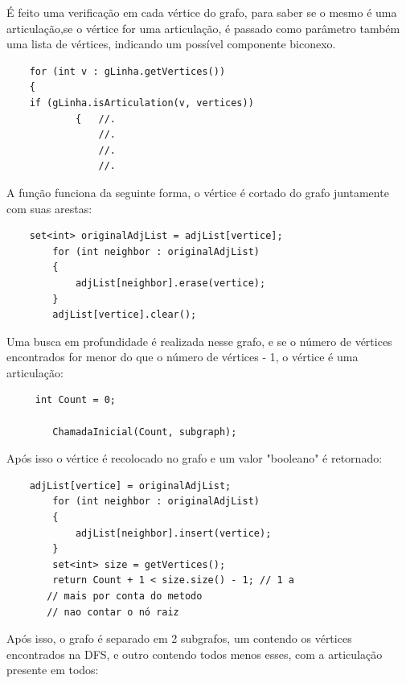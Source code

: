 \documentclass[10pt,conference]{IEEEtran}
\begin{document}
É feito uma verificação em cada vértice do grafo, para saber se o mesmo é uma articulação,se o vértice for uma articulação,
é passado como parâmetro também uma lista de vértices, indicando um possível componente biconexo. \begin{lstlisting}
    for (int v : gLinha.getVertices())
    {
    if (gLinha.isArticulation(v, vertices))
            {   //.
                //.
                //.
                //.
\end{lstlisting}

A função funciona da seguinte forma, o vértice é cortado do grafo juntamente com suas arestas: \begin{lstlisting}
    set<int> originalAdjList = adjList[vertice];
        for (int neighbor : originalAdjList)
        {
            adjList[neighbor].erase(vertice);
        }
        adjList[vertice].clear();
\end{lstlisting}
Uma busca em profundidade é realizada nesse grafo, e se o número de vértices encontrados for menor do que o número de vértices - 1, o vértice é uma articulação:
\begin{lstlisting}
     int Count = 0;

        ChamadaInicial(Count, subgraph);

\end{lstlisting}

Após isso o vértice é recolocado no grafo e um valor "booleano" é retornado:
\begin{lstlisting}
    adjList[vertice] = originalAdjList;
        for (int neighbor : originalAdjList)
        {
            adjList[neighbor].insert(vertice);
        }
        set<int> size = getVertices();
        return Count + 1 < size.size() - 1; // 1 a 
       // mais por conta do metodo 
       // nao contar o nó raiz
\end{lstlisting}

Após isso, o grafo é separado em 2 subgrafos, um contendo os vértices encontrados na DFS, e outro contendo todos menos esses, com a articulação presente em todos:
\end{document}
